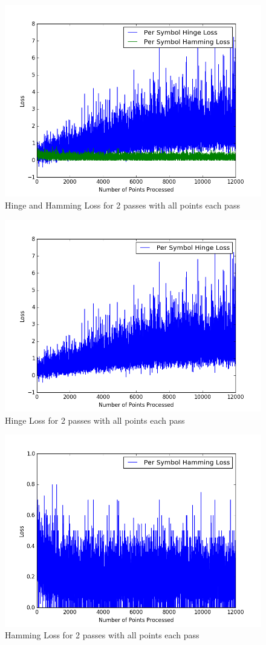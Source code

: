 \documentclass[twoside,11pt]{article}
\theoremstyle{definition}
\begin{document}
\begin{figure}[h]
\centering
\includegraphics[width=5in]{hingeHammingLoss2.png}
\caption{Hinge and Hamming Loss for 2 passes with all points each pass}
\end{figure}

\begin{figure}[h]
\centering
\includegraphics[width=5in]{hingeLoss2.png}
\caption{Hinge Loss for 2 passes with all points each pass}
\end{figure}

\begin{figure}[h]
\centering
\includegraphics[width=5in]{hammingLoss2.png}
\caption{Hamming Loss for 2 passes with all points each pass}
\end{figure}
\end{document}
